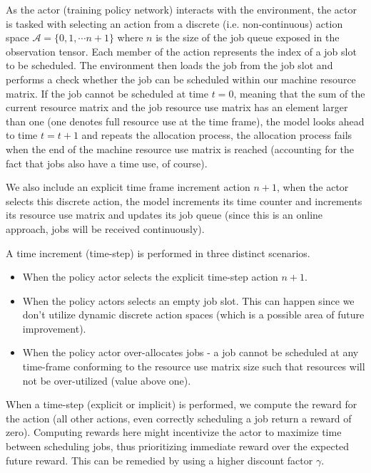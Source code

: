 \documentclass{article}
\begin{document}
\begin{spacing}{2.0}
As the actor (training policy network) interacts with the environment, the actor is tasked with selecting an action from a discrete (i.e. non-continuous)
action space $\mathcal{A} = \{ 0, 1, \cdots n + 1 \}$ where $n$ is the size of the job queue exposed in the observation tensor. Each member of the action
represents the index of a job slot to be scheduled. The environment then loads the job from the job slot and performs a check whether the job can be scheduled
within our machine resource matrix. If the job cannot be scheduled at time $t = 0$, meaning that the sum of the current resource matrix and the job resource
use matrix has an element larger than one (one denotes full resource use at the time frame), the model looks ahead to time $t = t + 1$ and repeats the allocation
process, the allocation process fails when the end of the machine resource use matrix is reached (accounting for the fact that jobs also have a time use, of course).

We also include an explicit time frame increment action $n + 1$, when the actor selects this discrete action, the model increments its time counter and increments its resource use matrix and updates its job queue (since this is an online approach, jobs will be received continuously).

A time increment (time-step) is performed in three distinct scenarios.

\begin{itemize}
    \item When the policy actor selects the explicit time-step action $n + 1$.
    \item When the policy actors selects an empty job slot. This can happen since we don't utilize dynamic discrete action spaces (which is a possible area of future improvement).
    \item When the policy actor over-allocates jobs - a job cannot be scheduled at any time-frame conforming to the resource use matrix size such that resources will
    not be over-utilized (value above one).
\end{itemize}

When a time-step (explicit or implicit) is performed, we compute the reward for the action (all other actions, even correctly scheduling a job return a reward of zero).
Computing rewards here might incentivize the actor to maximize time between scheduling jobs, thus prioritizing immediate reward over the expected future reward.
This can be remedied by using a higher discount factor $\gamma$.


\end{spacing}
\end{document}

